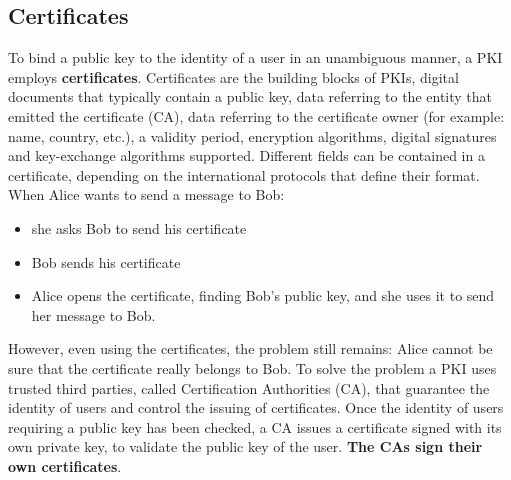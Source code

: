 \documentclass[a4paper, 10pt, titlepage]{article}
\begin{document}
\subsection{Certificates}
To bind a public key to the identity of a user in an unambiguous
manner, a PKI employs \textbf{certificates}. Certificates are the building blocks of PKIs, digital documents that typically contain a public key, data referring to the entity that emitted the certificate (CA), data referring to the certificate owner (for example: name,
country, etc.), a validity period, encryption algorithms, digital signatures and key-exchange algorithms supported. Different fields can be contained in a certificate, depending on the international protocols that define their format.\\
When Alice wants to send a message to Bob:
\begin{itemize}
\item she asks Bob to send his certificate
\item Bob sends his certificate
\item Alice opens the certificate, finding Bob’s public key, and she uses it to send her message to Bob.
\end{itemize} 
However, even using the certificates, the problem still remains: Alice cannot be sure that the certificate really belongs to Bob.
To solve the problem a PKI uses trusted third parties, called Certification Authorities (CA), that guarantee the identity of users and control the issuing of certificates. Once the identity of users requiring a public key has been checked, a CA issues a certificate signed with its own private key, to validate the public key of the user. \textbf{The CAs sign their own certificates}.
\end{document}
